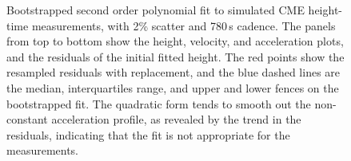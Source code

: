 \documentclass[structabstract]{aa}
\begin{document}
\begin{figure}[t]
\centering
{}
\caption{Bootstrapped second order polynomial fit to simulated CME height-time measurements, with 2\% scatter and 780\,s cadence. The panels from top to bottom show the height, velocity, and acceleration plots, and the residuals of the initial fitted height. The red points show the resampled residuals with replacement, and the blue dashed lines are the median, interquartiles range, and upper and lower fences on the bootstrapped fit. The quadratic form tends to smooth out the non-constant acceleration profile, as revealed by the trend in the residuals, indicating that the fit is not appropriate for the measurements.}
\label{fig_quadratic}
\end{figure}
\end{document}
